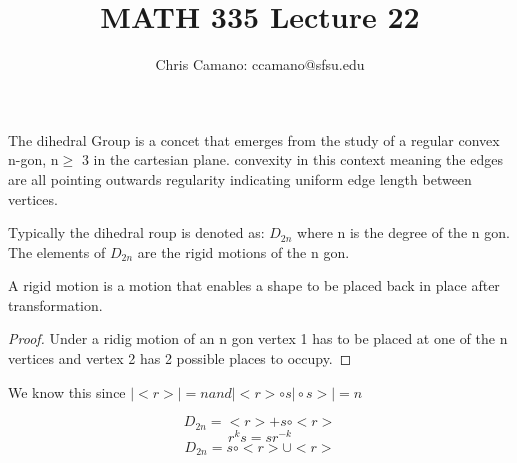 \documentclass[11pt]{article}
\author{Chris Camano: ccamano@sfsu.edu}
\title{MATH 335  Lecture 22 }
\date
\theoremstyle{definition}  %
\newcommand{\block}[2]{\begin{tcolorbox}[title={#1}]{#2}\end{tcolorbox}}
\begin{document}
\maketitle
\block{Definition: The Dihedral Group}{
The dihedral Group is a concet that emerges from the study of a regular convex n-gon, n$\geq$ 3 in the cartesian plane. convexity in this context meaning the edges are all pointing outwards regularity indicating uniform edge length between vertices.
}
Typically the dihedral roup is denoted as: $D_{2n}$ where n is the degree of the n gon. \\
The elements of $D_{2n}$ are the rigid motions of the n gon.
\block{Definition: Rigid motion}{
A rigid motion is a motion that enables a shape to be placed back in place after transformation.
}
\block{Definition:$D_6$=\{$ S_3$\}=\{r,s,$r\circ s$, $s\circ r $,e,$r^2$\}}
{}
\block{proposition: $|D_{2n}|=2n$}{
}
\begin{proof}
  Under a ridig motion of an n gon vertex 1 has to be placed at one of the n vertices and vertex 2 has 2 possible places to occupy.
\end{proof}
\block{Definition=$<r>\subset D_{2n}$}
{We know this since $|<r>|=n and |<r>\circ s|\circ s>|=n$}



\[
  D_{2n}=<r>+s\circ<r>
\]
\[
  r^ks=sr^{-k}
\]
\[
  D_{2n}=s\circ <r>\cup<r>
\]
\end{document}
